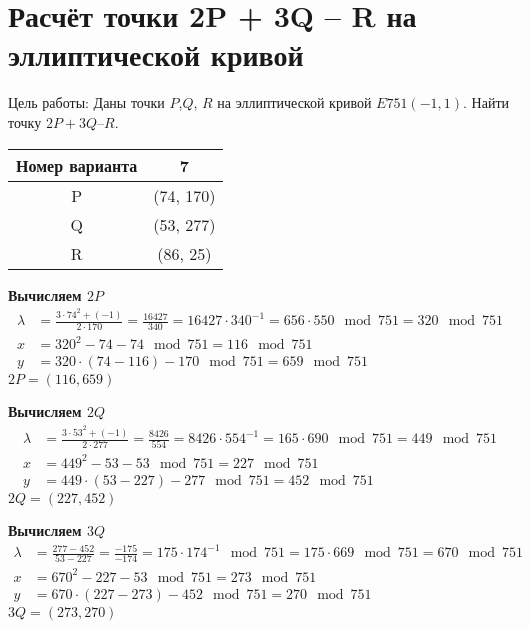 \section{Расчёт точки 2P + 3Q – R на эллиптической кривой}

Цель работы: Даны точки $P$,$Q$, $R$ на эллиптической кривой $E751 (−1,1)$. Найти точку $2P + 3Q – R$.

\begin{table}[H]
\centering
\begin{tabular}{|c|c|}
	\hline 
	Номер варианта & 7 \\ 
	\hline 
	P & (74, 170) \\ 
	\hline 
	Q & (53, 277) \\ 
	\hline 
	R & (86, 25) \\ 
	\hline 
\end{tabular} 
\end{table}

\textbf{Вычисляем $2P$}
\begin{equation*}
	\begin{aligned}
		\lambda &= \frac{ 3 \cdot 74^2 + (-1) }{2 \cdot 170} = \frac{16427}{340} = 16427 \cdot 340^{-1} = 656 \cdot 550\mod{751} = 320\mod{751} \\
		x &= 320^2 - 74 - 74 \mod{751} = 116\mod{751} \\
		y &= 320 \cdot (74 - 116) - 170\mod{751} = 659\mod{751}
	\end{aligned}
\end{equation*}
\textbf{$2P=(116, 659)$}

\textbf{Вычисляем $2Q$}
\begin{equation*}
	\begin{aligned}
		\lambda &= \frac{ 3 \cdot 53^2 + (-1) }{2 \cdot 277} = \frac{8426}{554} = 8426 \cdot 554^{-1} = 165 \cdot 690\mod{751} = 449\mod{751} \\
		x &= 449^2 - 53 - 53 \mod{751} = 227\mod{751} \\
		y &= 449 \cdot (53 - 227) - 277\mod{751} = 452\mod{751}
	\end{aligned}
\end{equation*}
\textbf{$2Q=(227, 452)$}

\textbf{Вычисляем $3Q$}
\begin{equation*}
	\begin{aligned}
		\lambda &= \frac{277-452}{53-227} = \frac{-175}{-174} = 175 \cdot 174^{-1}\mod{751} = 175 \cdot 669\mod{751} = 670\mod{751} \\
		x &= 670^2 - 227 - 53 \mod{751} = 273\mod{751} \\
		y &= 670 \cdot (227 - 273) - 452\mod{751} = 270\mod{751}
	\end{aligned}
\end{equation*}
\textbf{$3Q=(273, 270)$}

